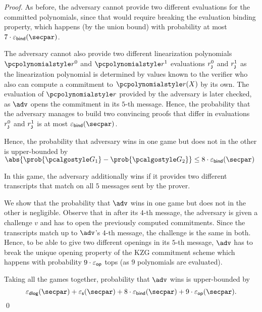 \begin{proof}
As before, the adversary cannot provide two different evaluations for the
committed polynomials, since that would require breaking the evaluation
binding property, which happens (by the union bound) with probability at most
$7 \cdot \epsbind (\secpar)$. 

The adversary cannot also provide two different linearization polynomials
$\p{r^0}$ and $\p{r^1}$ evaluations $r^0_{\mathfrak{z}}$ and $r^1_{\mathfrak{z}}$ as the
linearization polynomial is determined by values known to the verifier who
also can compute a commitment to $\p{r}(X)$ by its
own. The evaluation of $\p{r}$ provided by the adversary is later checked, as
$\adv$ opens the commitment in its $5$-th message. Hence, the probability that the
adversary manages to build two convincing proofs that differ in evaluations
$r^0_{\mathfrak{z}}$ and $r^1_{\mathfrak{z}}$ is at most $\epsbind (\secpar)$.

Hence, the probability that adversary wins in one game but does not in the
other is upper-bounded by $\abs{\prob{\game{1}} - \prob{\game{2}}} \leq  8 \cdot \epsbind (\secpar)$

 In this game, the adversary additionally wins if it provides two different transcripts that
match on all $5$ messages sent by the prover.

 We show that the probability that $\adv$
wins in one game but does not in the other is negligible.  Observe that in
after its $4$-th message, the adversary is given a challenge $v$ and has to open
the previously computed commitments. Since the transcripts match up to $\adv$'s 
$4$-th message, the challenge is the same in both. Hence, to be able to give two different
openings in its $5$-th message, $\adv$ has to break the unique opening property of the
KZG commitment scheme which happens with probability $9 \cdot \varepsilon_{\mathsf{op}}$ tops (as $9$
polynomials are evaluated).

 Taking all the games together, probability that $\adv$ wins
is upper-bounded by
\[
\epsdlog (\secpar) + \epss (\secpar) + 8 \cdot \epsbind (\secpar) + 9 \cdot \epsop (\secpar).
\]
\qed
	\end{proof}

